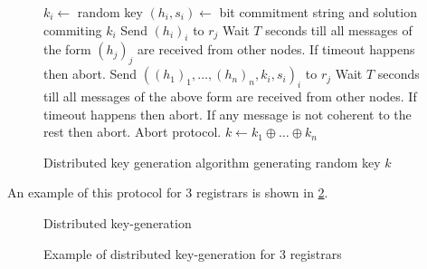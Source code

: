 \begin{figure}
  \begin{algorithmic}[1]
  \STATE $k_i \leftarrow $ random key
  \STATE $(h_i, s_i) \leftarrow $ bit commitment string and solution commiting
  $k_i$
    \STATE Send $(h_i)_{i}$ to $r_j$
  \ENDFOR
  \STATE Wait $T$ seconds till all messages of the form $(h_j)_j$ are received
  from other nodes. If timeout happens then abort.
    \STATE Send $\left( (h_1)_1, \ldots, (h_n)_{n}, k_i, s_i\right)_i$ to $r_j$
  \ENDFOR
  \STATE Wait $T$ seconds till all messages of the above form are received
  from other nodes. If timeout happens then abort. If any message is not
  coherent to the rest then abort.
      \STATE Abort protocol.
    \ENDIF
  \ENDFOR
  \STATE $k \leftarrow k_1 \oplus \ldots \oplus k_n$
\end{algorithmic}
  \caption{Distributed key generation algorithm generating random key $k$}
  \label{fig:key_gen_alg}
\end{figure}

An example of this protocol for 3 registrars is shown in
\ref{fig:key_gen_example}.

\begin{figure}
\begin{msc}{Distributed key-generation}
\setlength{\instdist}{5.5cm}
\setlength{\envinstdist}{3cm}
\nextlevel[5]
\nextlevel[2]
\nextlevel[2]
\nextlevel[2]
\nextlevel[2]
\nextlevel[2]
\nextlevel[2]
\nextlevel[2]
\nextlevel[2]
\nextlevel[2]
\nextlevel[4]
\end{msc}
\caption{Example of distributed key-generation for 3 registrars}
\label{fig:key_gen_example}
\end{figure}

